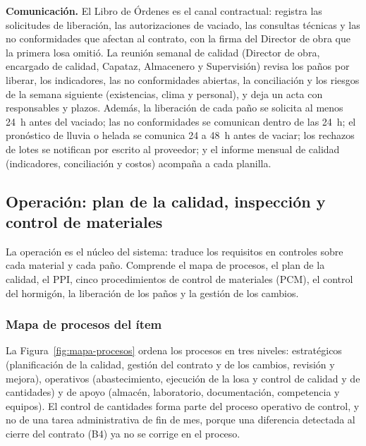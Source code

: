 \textbf{Comunicación.} El Libro de Órdenes es el canal contractual: registra las solicitudes de liberación, las autorizaciones de vaciado, las consultas técnicas y las no conformidades que afectan al contrato, con la firma del Director de obra que la primera losa omitió. La reunión semanal de calidad (Director de obra, encargado de calidad, Capataz, Almacenero y Supervisión) revisa los paños por liberar, los indicadores, las no conformidades abiertas, la conciliación y los riesgos de la semana siguiente (existencias, clima y personal), y deja un acta con responsables y plazos. Además, la liberación de cada paño se solicita al menos 24~h antes del vaciado; las no conformidades se comunican dentro de las 24~h; el pronóstico de lluvia o helada se comunica 24 a 48~h antes de vaciar; los rechazos de lotes se notifican por escrito al proveedor; y el informe mensual de calidad (indicadores, conciliación y costos) acompaña a cada planilla.

\subsection{Operación: plan de la calidad, inspección y control de materiales}
\label{sec:sgc-operacion}

La operación es el núcleo del sistema: traduce los requisitos en controles sobre cada material y cada paño. Comprende el mapa de procesos, el plan de la calidad, el PPI, cinco procedimientos de control de materiales (PCM), el control del hormigón, la liberación de los paños y la gestión de los cambios.

\subsubsection{Mapa de procesos del ítem} La Figura~\ref{fig:mapa-procesos} ordena los procesos en tres niveles: estratégicos (planificación de la calidad, gestión del contrato y de los cambios, revisión y mejora), operativos (abastecimiento, ejecución de la losa y control de calidad y de cantidades) y de apoyo (almacén, laboratorio, documentación, competencia y equipos). El control de cantidades forma parte del proceso operativo de control, y no de una tarea administrativa de fin de mes, porque una diferencia detectada al cierre del contrato (B4) ya no se corrige en el proceso.

